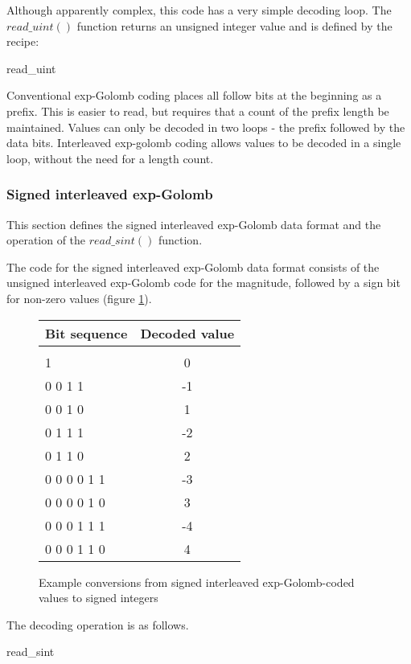 Although apparently complex, this code has a very simple decoding loop. The 
$read\_uint()$ function returns an unsigned integer value and is defined by the recipe:

\begin{pseudo}{read\_uint}{}
  \bsEND
\bsEND
{}

\end{pseudo}


\begin{informative}
Conventional exp-Golomb coding places all follow bits at the beginning as a prefix. This is
easier to read, but requires that a count of the prefix length be maintained. Values can only
be decoded in two loops - the prefix followed by the data bits. Interleaved exp-golomb 
coding allows values to be decoded in a single loop, without the need for a length count.
\end{informative}

\subsubsection{Signed interleaved exp-Golomb}
\label{segol}

This section defines the signed interleaved exp-Golomb data format and the operation
of the $read\_sint()$ function.

The code for the signed interleaved exp-Golomb data format consists of the
unsigned interleaved exp-Golomb code for the magnitude, followed by a sign bit
for non-zero values (figure \ref{segolcodings}).

\begin{figure}[h]
\centering
\begin{tabular}{l|c}
Bit sequence & Decoded value \\
\hline\\
1                 &  0\\
0 0 1 1           &  -1\\
0 0 1 0           &  1\\
0 1 1 1            &  -2\\
0 1 1 0            &  2\\
0 0 0 0 1 1         &  -3\\
0 0 0 0 1 0         &  3\\
0 0 0 1 1 1         &  -4\\
0 0 0 1 1 0         &  4\\
\end{tabular}

\caption{Example conversions from signed interleaved exp-Golomb-coded values 
to signed integers \label{segolcodings}}
\end{figure}

The decoding operation is as follows.

\begin{pseudo}{read\_sint}{}
\bsEND
{}

\end{pseudo}


